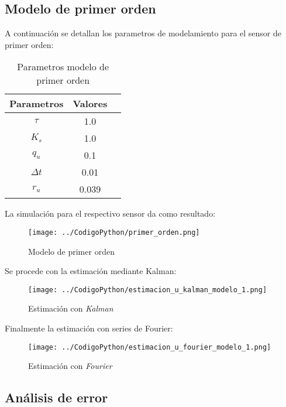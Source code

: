 \documentclass[conference]{IEEEtran}
\begin{document}
\subsection{Modelo de primer orden}

A continuación se detallan los parametros de modelamiento para el sensor de primer orden:

\begin{table}[h]
	\centering
	\caption{Parametros modelo de primer orden}
	\label{tab:parametros_primer_orden}
	\begin{tabular}{|c|c|c|}
		\hline
		\textbf{Parametros} & \textbf{Valores} \\
		\hline
		$\tau$  &  1.0 \\
		$K_s$      & 1.0 \\
		$q_u$ & 0.1 \\
		$\Delta t$ & 0.01 	\\  
		$r_u$ & 0.039 \\ 
		\hline
	\end{tabular}
	
\end{table}

\newpage

La simulación para el respectivo sensor da como resultado:

\begin{figure}[h]
	\centering
	\texttt{[image: ../CodigoPython/primer\_orden.png]}
	\caption{Modelo de primer orden}
	\label{fig:primer_orden}
\end{figure}

Se procede con la estimación mediante Kalman:

\begin{figure}[h]
	\centering
	\texttt{[image: ../CodigoPython/estimacion\_u\_kalman\_modelo\_1.png]}
	\caption{Estimaci\'on con \textit{Kalman}}
	\label{fig:u_modelo_1}
\end{figure}

Finalmente la estimación con series de Fourier:


\begin{figure}[h]
	\centering
	\texttt{[image: ../CodigoPython/estimacion\_u\_fourier\_modelo\_1.png]}
	\caption{Estimaci\'on con \textit{Fourier}}
	\label{fig:u_modelo_1}
\end{figure}

\subsection{An\'alisis de error} 
\end{document}
